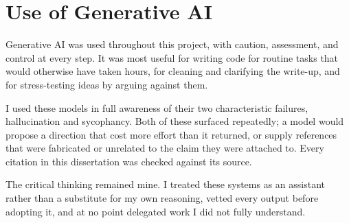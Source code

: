 \documentclass[10pt,twocolumn,a4paper]{article}
\begin{document}
\clearpage


\clearpage
\section{Use of Generative AI}
\label{app:ai}

Generative AI was used throughout this project, with caution,
assessment, and control at every step. It was most useful for writing
code for routine tasks that would otherwise have taken hours, for
cleaning and clarifying the write-up, and for stress-testing ideas by
arguing against them.

I used these models in full awareness of their two characteristic
failures, hallucination and sycophancy. Both of these surfaced repeatedly; a
model would propose a direction that cost more effort than it returned,
or supply references that were fabricated or unrelated to the claim
they were attached to. Every citation in this dissertation was checked
against its source.

The critical thinking remained mine. I treated these systems as an
assistant rather than a substitute for my own reasoning, vetted every
output before adopting it, and at no point delegated work I did not
fully understand.
\end{document}
